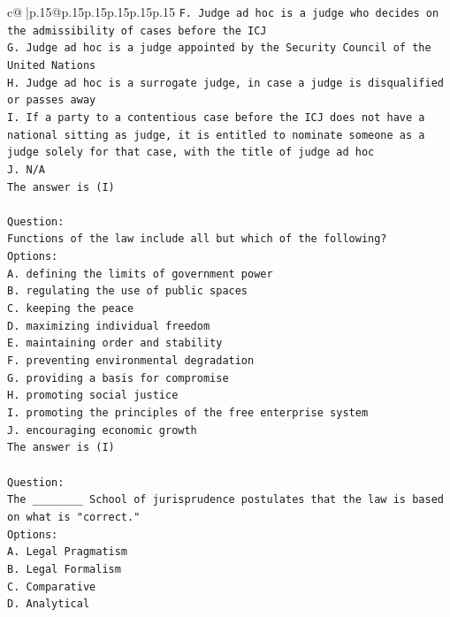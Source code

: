 \documentclass{article}
\begin{document}
{\begin{supertabular}{c@{$\;$}|p{.15\linewidth}@{}p{.15\linewidth}p{.15\linewidth}p{.15\linewidth}p{.15\linewidth}p{.15\linewidth}}
{{{\texttt{F. Judge ad hoc is a judge who decides on the admissibility of cases before the ICJ} \\
\texttt{G. Judge ad hoc is a judge appointed by the Security Council of the United Nations} \\
\texttt{H. Judge ad hoc is a surrogate judge, in case a judge is disqualified or passes away} \\
\texttt{I. If a party to a contentious case before the ICJ does not have a national sitting as judge, it is entitled to nominate someone as a judge solely for that case, with the title of judge ad hoc} \\
\texttt{J. N/A} \\
\texttt{The answer is (I)} \\
\\ 
\texttt{Question:} \\
\texttt{Functions of the law include all but which of the following?} \\
\texttt{Options:} \\
\texttt{A. defining the limits of government power} \\
\texttt{B. regulating the use of public spaces} \\
\texttt{C. keeping the peace} \\
\texttt{D. maximizing individual freedom} \\
\texttt{E. maintaining order and stability} \\
\texttt{F. preventing environmental degradation} \\
\texttt{G. providing a basis for compromise} \\
\texttt{H. promoting social justice} \\
\texttt{I. promoting the principles of the free enterprise system} \\
\texttt{J. encouraging economic growth} \\
\texttt{The answer is (I)} \\
\\ 
\texttt{Question:} \\
\texttt{The \_\_\_\_\_\_\_\_ School of jurisprudence postulates that the law is based on what is "correct."} \\
\texttt{Options:} \\
\texttt{A. Legal Pragmatism} \\
\texttt{B. Legal Formalism} \\
\texttt{C. Comparative} \\
\texttt{D. Analytical} \\
}}}
\end{supertabular}}
\end{document}
